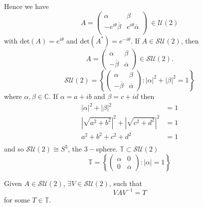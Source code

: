 \documentclass{article}
\begin{document}
Hence we have
\begin{equation}
    A =
    \begin{pmatrix}
        \alpha & \beta \\
        -e^{i\theta}\overline{\beta} & e^{i\theta}\overline{\alpha} \\
    \end{pmatrix}
    \ \in \mathcal{U}(2)
\end{equation}
with $\text{det}\left( A \right) = e^{i\theta}$ and $\text{det}\left( A^{*} \right) = e^{-i\theta}$.
If $A \in \mathcal{SU}(2)$, then 
\begin{equation}
    A = 
    \begin{pmatrix}
        \alpha & \beta \\
        -\overline{\beta} & \overline{\alpha}
    \end{pmatrix}
    \in \mathcal{SU}(2).
\end{equation}
\begin{equation}
    \mathcal{SU}(2) = 
    \left\{ 
        \begin{pmatrix}
            \alpha & \beta \\
            -\overline{\beta} & \overline{\alpha}
        \end{pmatrix}
        :
        | \alpha |^{2} + | \beta |^{2} = 1
    \right\}
\end{equation}
where $\alpha, \beta \in \mathbb{C}$. If $\alpha = a+ib$ and $\beta = c+id$ then
\begin{equation}
    \begin{split}
        | \alpha |^{2} + | \beta |^{2} &= 1 \\
        \left| \sqrt{a^{2} + b^{2}} \right|^{2} + \left| \sqrt{c^{2} + d^{2}} \right|^{2} &= 1 \\
        {a^{2} + b^{2}} + {c^{2} + d^{2}} &= 1 \\
    \end{split}
\end{equation}
and so $\mathcal{SU}(2) \cong S^{3}$, the $3-$sphere. $\mathbb{T} \subset \mathcal{SU}(2)$
\begin{equation}
    \mathbb{T} = \left\{ 
        \begin{pmatrix}
            \alpha & 0 \\
            0 & \overline{\alpha}
        \end{pmatrix}
        :
        | \alpha | = 1
    \right\}
\end{equation}

\begin{theorem}
    Given $A \in \mathcal{SU}(2)$, $\exists V \in \mathcal{SU}(2)$, such that 
    \begin{equation}
        V A V^{-1} = T
    \end{equation} 
    for some $T \in \mathbb{T}$.
\end{theorem}
\end{document}
